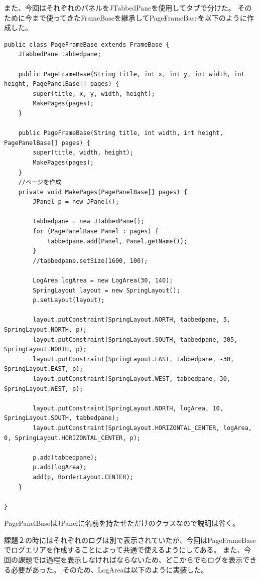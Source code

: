 \documentclass{jarticle}
\begin{document}
また、今回はそれぞれのパネルをJTabbedPaneを使用してタブで分けた。
そのために今まで使ってきたFrameBaseを継承してPageFrameBaseを以下のように作成した。
\begin{lstlisting}[caption=PageFrameBase,label=src:PageFrameBase]
public class PageFrameBase extends FrameBase {
	JTabbedPane tabbedpane;

	public PageFrameBase(String title, int x, int y, int width, int height, PagePanelBase[] pages) {
		super(title, x, y, width, height);
		MakePages(pages);
	}

	public PageFrameBase(String title, int width, int height, PagePanelBase[] pages) {
		super(title, width, height);
		MakePages(pages);
	}
	//ページを作成
	private void MakePages(PagePanelBase[] pages) {
		JPanel p = new JPanel();

		tabbedpane = new JTabbedPane();
		for (PagePanelBase Panel : pages) {
			tabbedpane.add(Panel, Panel.getName());
		}
		//tabbedpane.setSize(1600, 100);

		LogArea logArea = new LogArea(30, 140);
		SpringLayout layout = new SpringLayout();
		p.setLayout(layout);

		layout.putConstraint(SpringLayout.NORTH, tabbedpane, 5, SpringLayout.NORTH, p);
		layout.putConstraint(SpringLayout.SOUTH, tabbedpane, 305, SpringLayout.NORTH, p);
		layout.putConstraint(SpringLayout.EAST, tabbedpane, -30, SpringLayout.EAST, p);
		layout.putConstraint(SpringLayout.WEST, tabbedpane, 30, SpringLayout.WEST, p);

		layout.putConstraint(SpringLayout.NORTH, logArea, 10, SpringLayout.SOUTH, tabbedpane);
		layout.putConstraint(SpringLayout.HORIZONTAL_CENTER, logArea, 0, SpringLayout.HORIZONTAL_CENTER, p);

		p.add(tabbedpane);
		p.add(logArea);
		add(p, BorderLayout.CENTER);
	}

}
\end{lstlisting}
PagePanelBaseはJPanelに名前を持たせただけのクラスなので説明は省く。

課題２の時にはそれぞれのログは別で表示されていたが、今回はPageFrameBaseでログエリアを作成することによって共通で使えるようにしてある。
また、今回の課題では過程を表示しなければならないため、どこからでもログを表示できる必要があった。
そのため、LogAreaは以下のように実装した。
\end{document}
